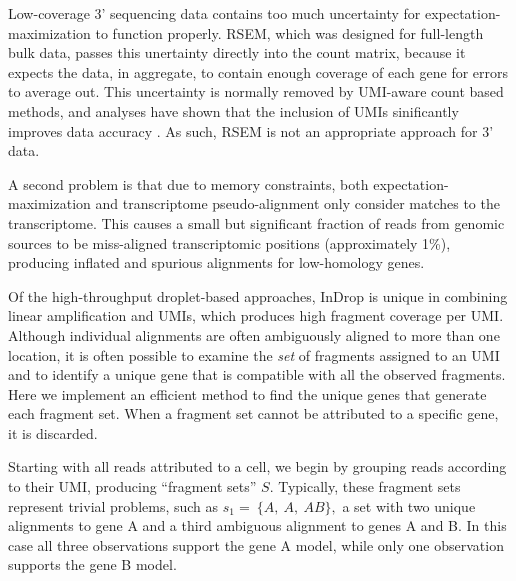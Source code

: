 Low-coverage 3' sequencing data contains too much uncertainty for expectation-maximization to function properly. 
RSEM, which was designed for full-length bulk data, passes this unertainty directly into the count matrix, because it expects the data, in aggregate, to contain enough coverage of each gene for errors to average out. 
This uncertainty is normally removed by UMI-aware count based methods, and analyses have shown that the inclusion of UMIs sinificantly improves data accuracy \citep{Grun2016}.
As such, RSEM is not an appropriate approach for 3' data. 

A second problem is that due to memory constraints, both expectation-maximization and transcriptome pseudo-alignment only consider matches to the transcriptome. 
This causes a small but significant fraction of reads from genomic sources to be miss-aligned transcriptomic positions (approximately 1\%), producing inflated and spurious alignments for low-homology genes.

Of the high-throughput droplet-based approaches, InDrop is unique in combining linear amplification and UMIs, which produces high fragment coverage per UMI\@. 
Although individual alignments are often ambiguously aligned to more than one location, it is often possible to examine the \textit{set} of fragments assigned to an UMI and to identify a unique gene that is compatible with all the observed fragments. 
Here we implement an efficient method to find the unique genes that generate each fragment set. 
When a fragment set cannot be attributed to a specific gene, it is discarded.

Starting with all reads attributed to a cell, we begin by grouping reads according to their UMI, producing ``fragment sets'' \(S\). 
Typically, these fragment sets represent trivial problems, such as \(s_{1} = \ \{ A,\ A,\ AB\},\) a set with two unique alignments to gene A and a third ambiguous alignment to genes A and B. 
In this case all three observations support the gene A model, while only one observation supports the gene B model.

